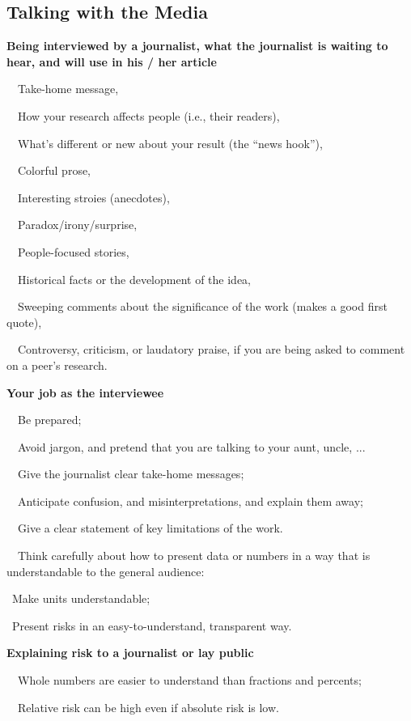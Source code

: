 \documentclass[a4paper, 12pt]{article}
\begin{document}
\subsection{Talking with the Media}

\textbf{Being interviewed by a journalist, what the journalist is waiting to hear, and will use in his / her article}
\par\ \textbullet\ Take-home message,
\par\ \textbullet\ How your research affects people (i.e., their readers),
\par\ \textbullet\ What's different or new about your result (the ``news hook''),
\par\ \textbullet\ Colorful prose,
\par\ \textbullet\ Interesting stroies (anecdotes),
\par\ \textbullet\ Paradox/irony/surprise,
\par\ \textbullet\ People-focused stories,
\par\ \textbullet\ Historical facts or the development of the idea,
\par\ \textbullet\ Sweeping comments about the significance of the work (makes a good first quote),
\par\ \textbullet\ Controversy, criticism, or laudatory praise, if you are being asked to comment on a peer's research.

\newpage\textbf{Your job as the interviewee}
\par\ \textbullet\ Be prepared;
\par\ \textbullet\ Avoid jargon, and pretend that you are talking to your aunt, uncle, ...
\par\ \textbullet\ Give the journalist clear take-home messages;
\par\ \textbullet\ Anticipate confusion, and misinterpretations, and explain them away;
\par\ \textbullet\ Give a clear statement of key limitations of the work.
\par\ \textbullet\ Think carefully about how to present data or numbers in a way that is understandable to the general audience:
\par\quad\textopenbullet\ Make units understandable;
\par\quad\textopenbullet\ Present risks in an easy-to-understand, transparent way.

\textbf{Explaining risk to a journalist or lay public}
\par\ \textbullet\ Whole numbers are easier to understand than fractions and percents;
\par\ \textbullet\ Relative risk can be high even if absolute risk is low.
\end{document}
